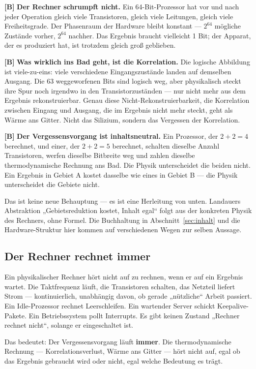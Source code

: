\textbf{[B]} \textbf{Der Rechner schrumpft nicht.} Ein 64-Bit-Prozessor hat vor und nach
jeder Operation gleich viele Transistoren, gleich viele Leitungen, gleich viele
Freiheitsgrade. Der Phasenraum der Hardware bleibt konstant --- $2^{64}$ mögliche
Zustände vorher, $2^{64}$ nachher. Das Ergebnis braucht vielleicht 1 Bit; der
Apparat, der es produziert hat, ist trotzdem gleich groß geblieben.

\textbf{[B]} \textbf{Was wirklich ins Bad geht, ist die Korrelation.} Die logische
Abbildung ist viele-zu-eins: viele verschiedene Eingangszustände landen auf
demselben Ausgang. Die 63 weggeworfenen Bits sind logisch weg, aber physikalisch
steckt ihre Spur noch irgendwo in den Transistorzuständen --- nur nicht mehr aus
dem Ergebnis rekonstruierbar. Genau diese Nicht-Rekonstruierbarkeit, die
Korrelation zwischen Eingang und Ausgang, die im Ergebnis nicht mehr steckt, geht
als Wärme ans Gitter. Nicht das Silizium, sondern das Vergessen der Korrelation.

\textbf{[B]} \textbf{Der Vergessensvorgang ist inhaltsneutral.} Ein Prozessor, der
$2+2=4$ berechnet, und einer, der $2+2=5$ berechnet, schalten dieselbe Anzahl
Transistoren, werfen dieselbe Bitbreite weg und zahlen dieselbe thermodynamische
Rechnung ans Bad. Die Physik unterscheidet die beiden nicht. Ein Ergebnis in
Gebiet A kostet dasselbe wie eines in Gebiet B --- die Physik unterscheidet die
Gebiete nicht.

Das ist keine neue Behauptung --- es ist eine Herleitung von unten. Landauers
Abstraktion „Gebietsreduktion kostet, Inhalt egal“ folgt aus der konkreten Physik
des Rechners, ohne Formel. Die Buchhaltung in Abschnitt~\ref{sec:inhalt} und die
Hardware-Struktur hier kommen auf verschiedenen Wegen zur selben Aussage.

\subsection{Der Rechner rechnet immer}
\label{sec:immer}

Ein physikalischer Rechner hört nicht auf zu rechnen, wenn er auf ein Ergebnis
wartet. Die Taktfrequenz läuft, die Transistoren schalten, das Netzteil liefert
Strom --- kontinuierlich, unabhängig davon, ob gerade „nützliche“ Arbeit
passiert. Ein Idle-Prozessor rechnet Leerschleifen. Ein wartender Server schickt
Keepalive-Pakete. Ein Betriebssystem pollt Interrupts. Es gibt keinen Zustand
„Rechner rechnet nicht“, solange er eingeschaltet ist.

Das bedeutet: Der Vergessensvorgang läuft \textbf{immer}. Die thermodynamische
Rechnung --- Korrelationsverlust, Wärme ans Gitter --- hört nicht auf, egal ob das
Ergebnis gebraucht wird oder nicht, egal welche Bedeutung es trägt.

